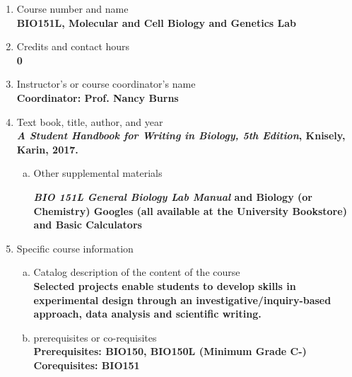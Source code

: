 \label{BIO151L}  %
\begin{enumerate}[1.]
\item Course number and name\\
  {\bfseries
    BIO151L, Molecular and Cell Biology and Genetics Lab
  }
  
\item Credits and contact hours\\
  {\bfseries
    0    
  }

\item Instructor's or course coordinator's name\\
  {\bfseries
    Coordinator: Prof. Nancy Burns
  }

\item Text book, title, author, and year\\
  {\bfseries
    {\em A Student Handbook for Writing in Biology, 5th Edition}, Knisely, Karin, 2017.
  }
\begin{enumerate}[a.]
\item Other supplemental materials\\
  {\bfseries
    {\em BIO 151L General Biology Lab Manual} and Biology (or Chemistry) Googles (all available at the University Bookstore)
    and Basic Calculators
    
  }
\end{enumerate}

\item Specific course information
\begin{enumerate}[a.]  
\item Catalog description of the content of the course\\
  {\bfseries
    Selected projects enable students to develop skills in experimental design through an investigative/inquiry-based approach, data analysis and scientific writing.    
  }

\item prerequisites or co-requisites\\
  {\bfseries
    Prerequisites: BIO150, BIO150L (Minimum Grade C-)\\    
    Corequisites: BIO151
  }


\end{enumerate}
\end{enumerate}
